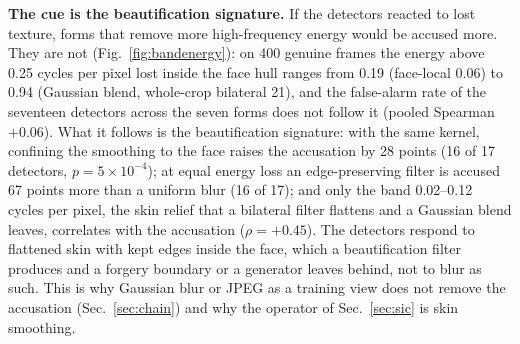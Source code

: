 \documentclass[conference]{IEEEtran}
\begin{document}
\textbf{The cue is the beautification signature.} If the detectors reacted to lost texture, forms that remove more
high-frequency energy would be accused more. They are not (Fig.~\ref{fig:bandenergy}): on 400 genuine frames the energy above
0.25 cycles per pixel lost inside the face hull ranges from 0.19 (face-local 0.06) to 0.94 (Gaussian blend, whole-crop
bilateral 21), and the false-alarm rate of the seventeen detectors across the seven forms does not follow it (pooled Spearman
$+0.06$). What it follows is the beautification signature: with the same kernel, confining the smoothing to the face raises the
accusation by 28 points (16 of 17 detectors, $p=5\times10^{-4}$); at equal energy loss an edge-preserving filter is accused 67
points more than a uniform blur (16 of 17); and only the band 0.02--0.12 cycles per pixel, the skin relief that a bilateral
filter flattens and a Gaussian blend leaves, correlates with the accusation ($\rho=+0.45$). The detectors respond to flattened
skin with kept edges inside the face, which a beautification filter produces and a forgery boundary or a generator leaves
behind, not to blur as such. This is why Gaussian blur or JPEG as a training view does not remove the accusation
(Sec.~\ref{sec:chain}) and why the operator of Sec.~\ref{sec:sic} is skin smoothing.
\end{document}
